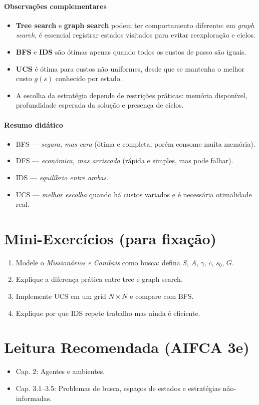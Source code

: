 \documentclass[9pt,a4paper]{extarticle}
\begin{document}
\paragraph{Observações complementares}
\begin{itemize}
  \item \textbf{Tree search} e \textbf{graph search} podem ter comportamento diferente: em \textit{graph search}, é essencial registrar estados visitados para evitar reexploração e ciclos.
  \item \textbf{BFS} e \textbf{IDS} são ótimas apenas quando todos os custos de passo são iguais.
  \item \textbf{UCS} é ótima para custos não uniformes, desde que se mantenha o melhor custo $g(s)$ conhecido por estado.
  \item A escolha da estratégia depende de restrições práticas: memória disponível, profundidade esperada da solução e presença de ciclos.
\end{itemize}

\paragraph{Resumo didático}
\begin{itemize}
  \item BFS — \textit{segura, mas cara} (ótima e completa, porém consome muita memória).
  \item DFS — \textit{econômica, mas arriscada} (rápida e simples, mas pode falhar).
  \item IDS — \textit{equilíbrio entre ambas}.
  \item UCS — \textit{melhor escolha} quando há custos variados e é necessária otimalidade real.
\end{itemize}


\section*{Mini-Exercícios (para fixação)}

\begin{enumerate}
  \item Modele o \textit{Missionários e Canibais} como busca: defina $S$, $A$, $\gamma$, $c$, $s_0$, $G$.
  \item Explique a diferença prática entre tree e graph search.
  \item Implemente UCS em um grid $N\times N$ e compare com BFS.
  \item Explique por que IDS repete trabalho mas ainda é eficiente.
\end{enumerate}

\section*{Leitura Recomendada (AIFCA 3e)}
\begin{itemize}
  \item Cap. 2: Agentes e ambientes.
  \item Cap. 3.1--3.5: Problemas de busca, espaços de estados e estratégias não-informadas.
\end{itemize}
\end{document}
